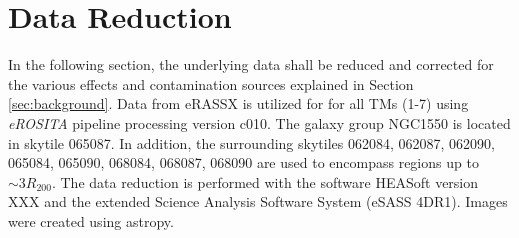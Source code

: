 
\chapter{Data Reduction}
\label{sec:data_reduction}
In the following section, the underlying data shall be reduced and corrected for the various effects and contamination sources explained in Section \ref{sec:background}. Data from eRASSX is utilized for for all TMs (1-7) using \textit{eROSITA} pipeline processing version c010. The galaxy group NGC1550 is located in skytile 065087. In addition, the surrounding skytiles 062084, 062087, 062090, 065084, 065090, 068084, 068087, 068090 are used to encompass regions up to \(\sim 3R_{200}\). The data reduction is performed with the software HEASoft version XXX and the extended Science Analysis Software System (eSASS 4DR1). Images were created using astropy.
%
